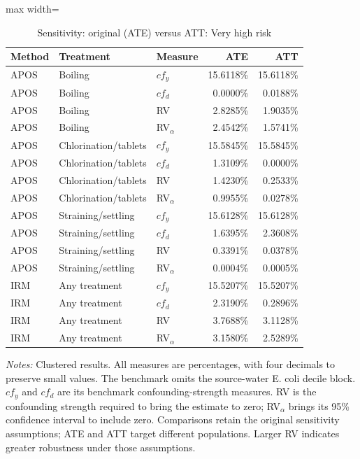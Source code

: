 \begin{table}[htbp]
\centering\scriptsize
\caption{Sensitivity: original (ATE) versus ATT: Very high risk}
\label{tab:table-ate-att-sensitivity-VeryHighRiskHome}
\begin{adjustbox}{max width=\linewidth}
\begin{tabular}{lllrr}
\toprule
Method & Treatment & Measure & ATE & ATT \\
\midrule
APOS & Boiling & $cf_y$ & 15.6118\% & 15.6118\% \\
APOS & Boiling & $cf_d$ & 0.0000\% & 0.0188\% \\
APOS & Boiling & RV & 2.8285\% & 1.9035\% \\
APOS & Boiling & RV$_\alpha$ & 2.4542\% & 1.5741\% \\
APOS & Chlorination/tablets & $cf_y$ & 15.5845\% & 15.5845\% \\
APOS & Chlorination/tablets & $cf_d$ & 1.3109\% & 0.0000\% \\
APOS & Chlorination/tablets & RV & 1.4230\% & 0.2533\% \\
APOS & Chlorination/tablets & RV$_\alpha$ & 0.9955\% & 0.0278\% \\
APOS & Straining/settling & $cf_y$ & 15.6128\% & 15.6128\% \\
APOS & Straining/settling & $cf_d$ & 1.6395\% & 2.3608\% \\
APOS & Straining/settling & RV & 0.3391\% & 0.0378\% \\
APOS & Straining/settling & RV$_\alpha$ & 0.0004\% & 0.0005\% \\
IRM & Any treatment & $cf_y$ & 15.5207\% & 15.5207\% \\
IRM & Any treatment & $cf_d$ & 2.3190\% & 0.2896\% \\
IRM & Any treatment & RV & 3.7688\% & 3.1128\% \\
IRM & Any treatment & RV$_\alpha$ & 3.1580\% & 2.5289\% \\
\bottomrule
\end{tabular}
\end{adjustbox}
\par\vspace{3pt}\begin{minipage}{\linewidth}\scriptsize\textit{Notes:} Clustered results. All measures are percentages, with four decimals to preserve small values. The benchmark omits the source-water E. coli decile block. $cf_y$ and $cf_d$ are its benchmark confounding-strength measures. RV is the confounding strength required to bring the estimate to zero; RV$_\alpha$ brings its 95\% confidence interval to include zero. Comparisons retain the original sensitivity assumptions; ATE and ATT target different populations. Larger RV indicates greater robustness under those assumptions.\end{minipage}
\end{table}
